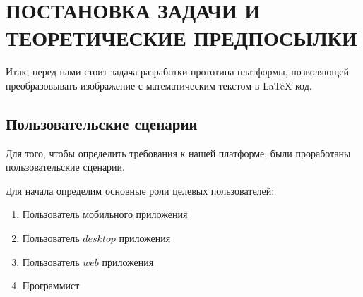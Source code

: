 \section{ПОСТАНОВКА ЗАДАЧИ И ТЕОРЕТИЧЕСКИЕ ПРЕДПОСЫЛКИ}

Итак, перед нами стоит задача разработки прототипа платформы, позволяющей преобразовывать изображение с математическим текстом в \LaTeX-код.

\subsection{Пользовательские сценарии}
Для того, чтобы определить требования к нашей платформе, были проработаны пользовательские сценарии.

Для начала определим основные роли целевых пользователей:
\begin{enumerate}
    \item Пользователь мобильного приложения
    \item Пользователь $desktop$ приложения
    \item Пользователь $web$ приложения
    \item Программист
\end{enumerate}